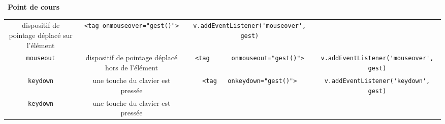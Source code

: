 \documentclass[
  11pt,
]{article}
\newcommand{\passthrough}[1]{#1}
\newcounter{cours}
\newenvironment{cours}[1]
{\par \medskip   \addtocounter{cours}{1} \noindent  
\begin{bclogo}[arrondi =0.1,  ombre = true, barre=none, logo=\bcbook, marge=4]{~\textbf{Point de cours} \textbf{\thecours} {\itshape #1} }  \par}
{
\end{bclogo}
 \par \bigskip }
\begin{document}
\begin{cours}{}
\begin{longtable}[]{@{}cccc@{}}
\begin{minipage}[t]{0.22\columnwidth}
dispositif de pointage déplacé sur l'élément\strut
\end{minipage} & \begin{minipage}[t]{0.22\columnwidth}\centering
\passthrough{\lstinline!<tag onmouseover="gest()">!}\strut
\end{minipage} & \begin{minipage}[t]{0.22\columnwidth}\centering
\passthrough{\lstinline!v.addEventListener('mouseover', gest)!}\strut
\end{minipage}\tabularnewline
\begin{minipage}[t]{0.22\columnwidth}\centering
\passthrough{\lstinline!mouseout!}\strut
\end{minipage} & \begin{minipage}[t]{0.22\columnwidth}\centering
dispositif de pointage déplacé hors de l'élément\strut
\end{minipage} & \begin{minipage}[t]{0.22\columnwidth}\centering
\passthrough{\lstinline!<tag      onmouseout="gest()">!}\strut
\end{minipage} & \begin{minipage}[t]{0.22\columnwidth}\centering
\passthrough{\lstinline!v.addEventListener('mouseover', gest)!}\strut
\end{minipage}\tabularnewline
\begin{minipage}[t]{0.22\columnwidth}\centering
\passthrough{\lstinline!keydown!}\strut
\end{minipage} & \begin{minipage}[t]{0.22\columnwidth}\centering
une touche du clavier est pressée\strut
\end{minipage} & \begin{minipage}[t]{0.22\columnwidth}\centering
\passthrough{\lstinline!<tag   onkeydown="gest()">!}\strut
\end{minipage} & \begin{minipage}[t]{0.22\columnwidth}\centering
\passthrough{\lstinline!v.addEventListener('keydown', gest)!}\strut
\end{minipage}\tabularnewline
\begin{minipage}[t]{0.22\columnwidth}\centering
\passthrough{\lstinline!keydown!}\strut
\end{minipage} & \begin{minipage}[t]{0.22\columnwidth}\centering
une touche du clavier est pressée\strut
\end{minipage} & \begin{minipage}[t]{0.22\columnwidth}\centering

\end{minipage}
\end{longtable}
\end{cours}
\end{document}

